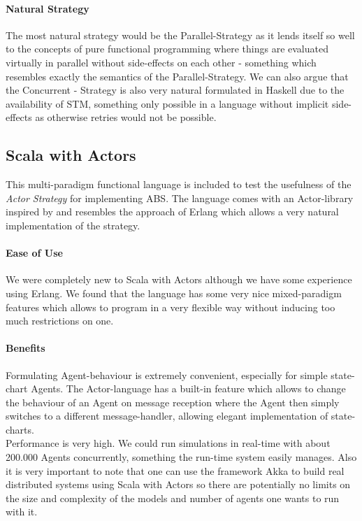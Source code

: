 \paragraph{Natural Strategy}
The most natural strategy would be the Parallel-Strategy as it lends itself so well to the concepts of pure functional programming where things are evaluated virtually in parallel without side-effects on each other - something which resembles exactly the semantics of the Parallel-Strategy. We can also argue that the Concurrent - Strategy is also very natural formulated in Haskell due to the availability of STM, something only possible in a language without implicit side-effects as otherwise retries would not be possible.



\subsection{Scala with Actors}
This multi-paradigm functional language is included to test the usefulness of the \textit{Actor Strategy} for implementing ABS. The language comes with an Actor-library inspired by \cite{agha_actors:_1986} and resembles the approach of Erlang which allows a very natural implementation of the strategy.

\paragraph{Ease of Use}
We were completely new to Scala with Actors although we have some experience using Erlang. We found that the language has some very nice mixed-paradigm features which allows to program in a very flexible way without inducing too much restrictions on one.

\paragraph{Benefits}
Formulating Agent-behaviour is extremely convenient, especially for simple state-chart Agents. The Actor-language has a built-in feature which allows to change the behaviour of an Agent on message reception where the Agent then simply switches to a different message-handler, allowing elegant implementation of state-charts. \\

Performance is very high. We could run simulations in real-time with about 200.000 Agents concurrently, something the run-time system easily manages. Also it is very important to note that one can use the framework Akka to build real distributed systems using Scala with Actors so there are potentially no limits on the size and complexity of the models and number of agents one wants to run with it.

